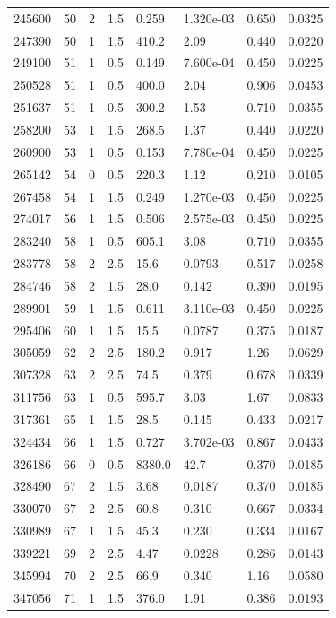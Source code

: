\documentclass[preview]{standalone}
\begin{document}
{{{\begin{tabular}{L{1.2cm}C{1.2cm} C{0.3cm}C{0.5cm} C{1.4cm}C{1.4cm} C{1.4cm}C{1.4cm}}
  245600  &    50  & 2     & 1.5 &  0.259  & 1.320e-03  & 0.650 &  0.0325   \\ 
  247390  &    50  & 1     & 1.5 &  410.2  & 2.09  & 0.440 &  0.0220   \\ 
  249100  &    51  & 1     & 0.5 &  0.149  & 7.600e-04  & 0.450 &  0.0225   \\ 
  250528  &    51  & 1     & 0.5 &  400.0  & 2.04  & 0.906 &  0.0453   \\ 
  251637  &    51  & 1     & 0.5 &  300.2  & 1.53  & 0.710 &  0.0355   \\ 
  258200  &    53  & 1     & 1.5 &  268.5  & 1.37  & 0.440 &  0.0220   \\ 
  260900  &    53  & 1     & 0.5 &  0.153  & 7.780e-04  & 0.450 &  0.0225   \\ 
  265142  &    54  & 0     & 0.5 &  220.3  & 1.12  & 0.210 &  0.0105   \\ 
  267458  &    54  & 1     & 1.5 &  0.249  & 1.270e-03  & 0.450 &  0.0225   \\ 
  274017  &    56  & 1     & 1.5 &  0.506  & 2.575e-03  & 0.450 &  0.0225   \\ 
  283240  &    58  & 1     & 0.5 &  605.1  & 3.08  & 0.710 &  0.0355   \\ 
  283778  &    58  & 2     & 2.5 &  15.6  & 0.0793  & 0.517 &  0.0258   \\ 
  284746  &    58  & 2     & 1.5 &  28.0  & 0.142  & 0.390 &  0.0195   \\ 
  289901  &    59  & 1     & 1.5 &  0.611  & 3.110e-03  & 0.450 &  0.0225   \\ 
  295406  &    60  & 1     & 1.5 &  15.5  & 0.0787  & 0.375 &  0.0187   \\ 
  305059  &    62  & 2     & 2.5 &  180.2  & 0.917  & 1.26 &  0.0629   \\ 
  307328  &    63  & 2     & 2.5 &  74.5  & 0.379  & 0.678 &  0.0339   \\ 
  311756  &    63  & 1     & 0.5 &  595.7  & 3.03  & 1.67 &  0.0833   \\ 
  317361  &    65  & 1     & 1.5 &  28.5  & 0.145  & 0.433 &  0.0217   \\ 
  324434  &    66  & 1     & 1.5 &  0.727  & 3.702e-03  & 0.867 &  0.0433   \\ 
  326186  &    66  & 0     & 0.5 &  8380.0  & 42.7  & 0.370 &  0.0185   \\ 
  328490  &    67  & 2     & 1.5 &  3.68  & 0.0187  & 0.370 &  0.0185   \\ 
  330070  &    67  & 2     & 2.5 &  60.8  & 0.310  & 0.667 &  0.0334   \\ 
  330989  &    67  & 1     & 1.5 &  45.3  & 0.230  & 0.334 &  0.0167   \\ 
  339221  &    69  & 2     & 2.5 &  4.47  & 0.0228  & 0.286 &  0.0143   \\ 
  345994  &    70  & 2     & 2.5 &  66.9  & 0.340  & 1.16 &  0.0580   \\ 
  347056  &    71  & 1     & 1.5 &  376.0  & 1.91  & 0.386 &  0.0193   \\ 
\hline 
\end{tabular} 

}}}
\end{document}
